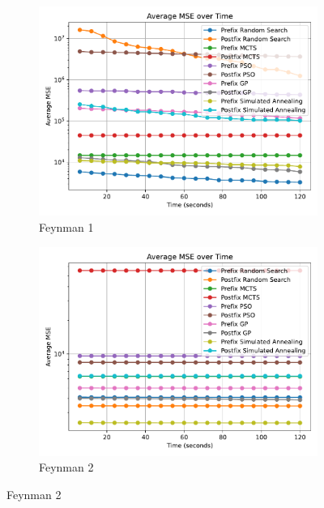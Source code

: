 \documentclass[runningheads]{llncs}
\begin{document}
\begin{figure}[]
    \centering
    
    \begin{subfigure}[b]{0.4\textwidth}
        \includegraphics[width=\linewidth, keepaspectratio]{AIFeynman_Benchmarks/Feynman_Benchmark_1.pdf}
        \caption{Feynman 1}
        \label{subfig:feynman_1}
    \end{subfigure}
    \begin{subfigure}[b]{0.4\textwidth}
        \includegraphics[width=\linewidth, keepaspectratio]{AIFeynman_Benchmarks/Feynman_Benchmark_2.pdf}
        \caption{Feynman 2}
        \label{subfig:feynman_2}
    \end{subfigure}
    

\end{figure}
\end{document}

